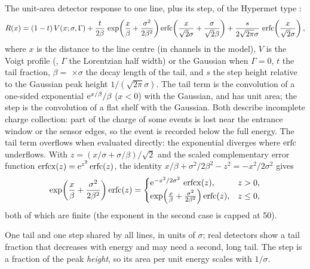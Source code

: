 The unit-area detector response to one line, plus its step, of the Hypermet type
\citep{Phillips1976,VanGysel2003}:
\begin{equation}
  R(x) = (1-t)\,V(x;\sigma,\Gamma)
  + \frac{t}{2\beta}\,\exp\!\left(\frac{x}{\beta}+\frac{\sigma^2}{2\beta^2}\right)
    \operatorname{erfc}\!\left(\frac{x}{\sqrt2\sigma}+\frac{\sigma}{\sqrt2\beta}\right)
  + \frac{s}{2\sqrt{2\pi}\sigma}\,\operatorname{erfc}\!\left(\frac{x}{\sqrt2\sigma}\right),
  \label{eq:hypermet}
\end{equation}
where $x$ is the distance to the line centre (in channels in the model), $V$ is the Voigt
profile (, $\Gamma$ the Lorentzian half width) or the Gaussian
when $\Gamma = 0$, $t$ the tail fraction, $\beta = $ $\times\sigma$ the decay
length of the tail, and $s$ the step height relative to the Gaussian peak height
$1/(\sqrt{2\pi}\sigma)$. The tail term is the convolution of a one-sided exponential
$\mathrm{e}^{x/\beta}/\beta$ ($x<0$) with the Gaussian, and has unit area; the step is the
convolution of a flat shelf with the Gaussian. Both describe incomplete charge collection:
part of the charge of some events is lost near the entrance window or the sensor edges, so
the event is recorded below the full energy.
 The tail term overflows when evaluated directly: the exponential diverges
where $\operatorname{erfc}$ underflows. With $z = (x/\sigma+\sigma/\beta)/\sqrt2$ and the scaled
complementary error function $\operatorname{erfcx}(z) = \mathrm{e}^{z^2}\operatorname{erfc}(z)$, the identity
$x/\beta + \sigma^2/2\beta^2 - z^2 = -x^2/2\sigma^2$ gives
\begin{equation}
  \exp\!\left(\frac{x}{\beta}+\frac{\sigma^2}{2\beta^2}\right)\operatorname{erfc}(z) =
  \begin{cases}
    \mathrm{e}^{-x^2/2\sigma^2}\,\operatorname{erfcx}(z), & z>0,\\
    \exp\!\left(\frac{x}{\beta}+\frac{\sigma^2}{2\beta^2}\right)\operatorname{erfc}(z), & z\le0,
  \end{cases}
\end{equation}
both of which are finite (the exponent in the second case is capped at 50).
\begin{hyp}
One tail and one step shared by all lines, in units of $\sigma$; real detectors show a tail
fraction that decreases with energy and may need a second, long tail. The step is a fraction
of the peak \emph{height}, so its area per unit energy scales with $1/\sigma$.
\end{hyp}

